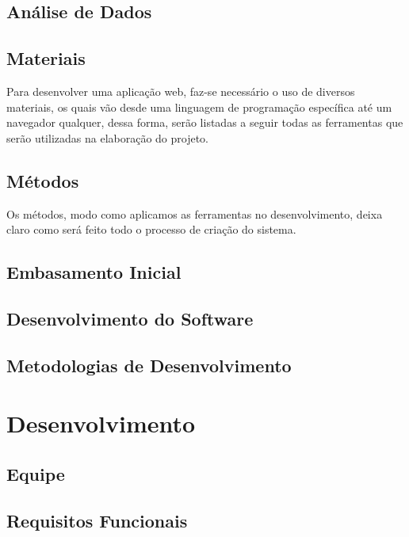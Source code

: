 \documentclass[
	article,			%
	12pt,				%
	oneside,			%
	a4paper,			%
	english,			%
	brazil,				%
	sumario=tradicional
	]{abntex2}
\begin{document}
\subsection{Análise de Dados}
\lipsum[1]

\subsection{Materiais}
Para desenvolver uma aplicação web, faz-se necessário o uso de diversos materiais, os quais vão desde uma linguagem de programação específica até um navegador qualquer, dessa forma, serão listadas a seguir todas as ferramentas que serão utilizadas na elaboração do projeto.
	
 \subsection{Métodos}
Os métodos, modo como aplicamos as ferramentas no desenvolvimento, deixa claro como será feito todo o processo de criação do sistema.

\subsection{Embasamento Inicial}
\lipsum[1]

\subsection{Desenvolvimento do Software}
\lipsum[1]

\subsection{Metodologias de Desenvolvimento}
\lipsum[1]

\section{Desenvolvimento}

\subsection{Equipe}
\lipsum[1]

\subsection{Requisitos Funcionais}
\end{document}
